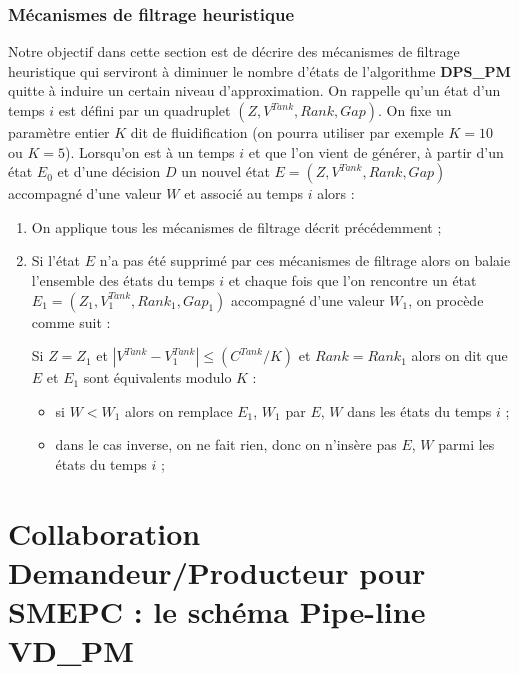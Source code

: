 \subsubsection{Mécanismes de filtrage heuristique}
Notre objectif dans cette section est de décrire des mécanismes de filtrage heuristique qui serviront à diminuer le nombre d'états de l'algorithme \textbf{DPS\_PM} quitte à induire un certain niveau d'approximation.
On rappelle qu'un état d'un temps $i$ est défini par un quadruplet $ (Z, V^{Tank} , Rank, Gap)$. On fixe un paramètre entier $K$ dit de fluidification (on pourra utiliser par exemple $K=10$ ou $K=5$).
Lorsqu'on est à un temps $i$ et que l'on vient de générer, à partir d'un état $E_0$
et d'une décision $D$ un nouvel état $E=(Z, V^{Tank} , Rank, Gap)$ accompagné d'une valeur $W$ et associé au temps $i$ alors :
\begin{enumerate}
	\item On applique tous les mécanismes de filtrage décrit précédemment ;
	\item Si l'état $E$ n'a pas été supprimé par ces mécanismes de filtrage alors on balaie l'ensemble des états du temps $i$ et chaque fois que l'on rencontre un état $E_1=(Z_1, V^{Tank}_1 , Rank_1, Gap_1)$ accompagné d'une valeur $W_1$, on procède comme suit :
	
	Si $Z =Z_1$ et $|V^{Tank} - V^{Tank}_1| \leq (C^{Tank} / K)$ et $Rank=Rank_1$ alors on dit que $E$ et $E_1$ sont équivalents modulo $K$ :
	\begin{itemize}[label=$\square$]
		\item si $W<W_1$ alors on remplace $E_1$, $W_1$ par $E$, $W$ dans les états du temps $i$ ;
		\item dans le cas inverse, on ne fait rien, donc on n'insère pas $E$, $W$ parmi les états du temps $i$ ;
	\end{itemize}
\end{enumerate}

\section{Collaboration Demandeur/Producteur pour SMEPC : le schéma Pipe-line VD\_PM}
\label{algo_VD_PM}

